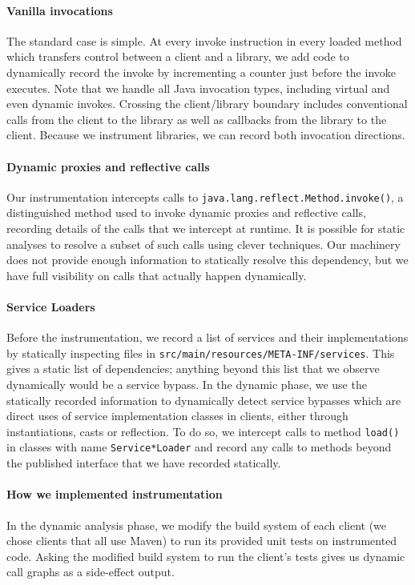 \paragraph{Vanilla invocations} 
The standard case is simple. At every invoke instruction in every
loaded method which transfers control between a client and a
library, we add code to dynamically record
the invoke by incrementing a counter just before the invoke
executes. Note that we handle all Java invocation types, including
virtual and even dynamic invokes. Crossing the client/library boundary
includes conventional calls from the client to the library as well as
callbacks from the library to the client.  Because we instrument
libraries, we can record both invocation directions.

\paragraph{Dynamic proxies and reflective calls}
Our instrumentation intercepts calls to
\texttt{java.lang.reflect.Method.invoke()}, a distinguished method
used to invoke dynamic proxies and reflective calls, 
recording details of the calls that we intercept at runtime. It is possible for
static analyses to resolve a subset of such calls using clever
techniques. Our machinery does not provide enough information to
statically resolve this dependency, but we have full visibility on
calls that actually happen dynamically.

\paragraph{Service Loaders} Before the instrumentation, we record a list 
of services and their implementations by statically inspecting files in \texttt{src/main/resources/META-INF/services}. 
This gives a static list of dependencies; anything beyond this list that we observe dynamically would be a service bypass. 
In the dynamic phase, we use the statically recorded information to dynamically detect service bypasses which are direct uses of service implementation 
classes in clients, either through instantiations, casts or reflection. To do so, we intercept calls 
to method \texttt{load()} in classes with name \texttt{Service*Loader} and record any calls to methods beyond 
the published interface that we have recorded statically.

\paragraph{How we implemented instrumentation}
In the dynamic analysis phase, we modify the build system of each
client (we chose clients that all use Maven) to run its provided unit tests on instrumented code.
Asking the modified build system to run the client's tests gives us dynamic call graphs as a side-effect output.

